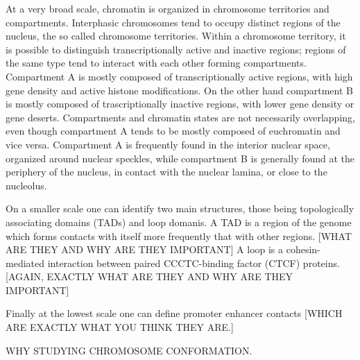 At a very broad scale, chromatin is organized in chromosome territories and compartments. Interphasic chromosomes tend to occupy distinct regions of the nucleus, the so called chromosome territories. Within a chromosome territory, it is possible to distinguish transcriptionally active and inactive regions; regions of the same type tend to interact with each other forming compartments. Compartment A is mostly composed of transcriptionally active regions, with high gene density and active histone modifications. On the other hand compartment B is mostly composed of trascriptionally inactive regions, with lower gene density or gene deserts. Compartments and chromatin states are not necessarily overlapping, even though compartment A tends to be mostly composed of euchromatin and vice versa. Compartment A is frequently found in the interior nuclear space, organized around nuclear speckles, while compartment B is generally found at the periphery of the nucleus, in contact with the nuclear lamina, or close to the nucleolus.

On a smaller scale one can identify two main structures, those being topologically associating domains (TADs) and loop domanis. A TAD is a region of the genome which forms contacts with itself more frequently that with other regions. [WHAT ARE THEY AND WHY ARE THEY IMPORTANT] A loop is a cohesin-mediated interaction between paired CCCTC-binding factor (CTCF) proteins. [AGAIN, EXACTLY WHAT ARE THEY AND WHY ARE THEY IMPORTANT]

Finally at the lowest scale one can define promoter enhancer contacts [WHICH ARE EXACTLY WHAT YOU THINK THEY ARE.]

WHY STUDYING CHROMOSOME CONFORMATION.

